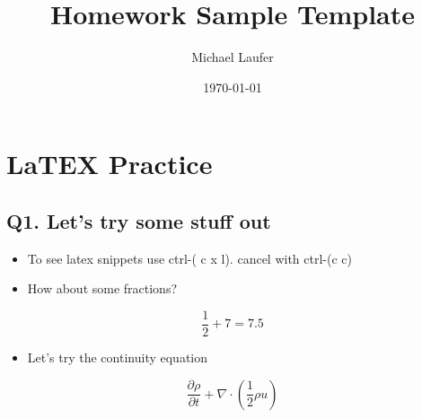 \documentclass[11pt]{article}
\author{Michael Laufer}
\date{\today}
\title{Homework Sample Template}
\begin{document}
\maketitle
\setcounter{secnumdepth}{-1}
\pagestyle{fancy}
\fancyhead{}
\small
\section{LaTEX Practice}
\label{sec-1}

\subsection{Q1. Let's try some stuff out}
\label{sec-1-1}
\begin{itemize}
\item To see latex snippets use ctrl-( c x l). cancel with ctrl-(c c)
\item How about some fractions?
\end{itemize}
\[\frac{1}{2} + 7 = 7.5\]
\begin{itemize}
\item Let's try the continuity equation
\end{itemize}
\[\frac{\partial \rho}{\partial t} + \nabla \cdot \left(\frac{1}{2}\rho u\right)\]
\end{document}
